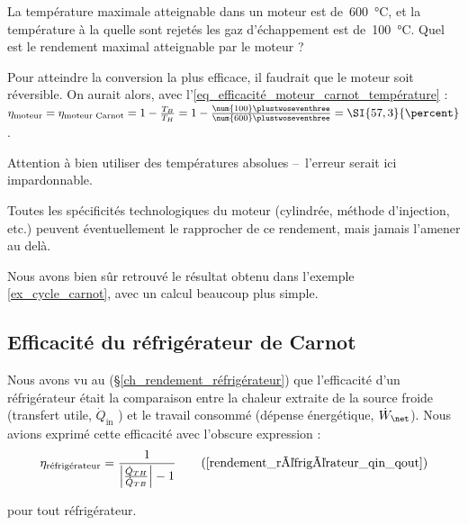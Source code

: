 		\begin{anexample}
		\label{ex_efficacite_moteur_carnot}
			La température maximale atteignable dans un moteur est de~\SI{600}{\degreeCelsius}, et la température à la quelle sont rejetés les gaz d’échappement est de~\SI{100}{\degreeCelsius}. Quel est le rendement maximal atteignable par le moteur ?
				\begin{answer}
					Pour atteindre la conversion la plus efficace, il faudrait que le moteur soit réversible. On aurait alors, avec l’\cref{eq_efficacité_moteur_carnot_température} : $\eta_\text{moteur} = \eta_\text{moteur Carnot} = 1 - \frac{T_B}{T_H} = 1 - \frac{\num{100}\plustwoseventhree}{\num{600}\plustwoseventhree} = \SI{57,3}{\percent}$.
					\begin{remark}Attention à bien utiliser des températures absolues --\ l’erreur serait ici impardonnable.\end{remark}
					\begin{remark}Toutes les spécificités technologiques du moteur (cylindrée, méthode d’injection, etc.) peuvent éventuellement le rapprocher de ce rendement, mais jamais l’amener au delà.\end{remark}
					\begin{remark}Nous avons bien sûr retrouvé le résultat obtenu dans l’exemple \ref{ex_cycle_carnot}, avec un calcul beaucoup plus simple.\end{remark}
				\end{answer}
		\end{anexample}


	\subsection{Efficacité du réfrigérateur de Carnot}

		Nous avons vu au (\S\ref{ch_rendement_réfrigérateur}) que l’efficacité d’un réfrigérateur était la comparaison entre la chaleur extraite de la source froide (transfert utile, $\dot Q_\text{in}$ ) et le travail consommé (dépense énergétique, $\dot W_\net$).  Nous avions exprimé cette efficacité avec l’obscure expression :
		\begin{equation}
			\eta_\text{réfrigérateur} = \frac{1}{ \left| \frac{\dot Q_{TH}}{\dot Q_{TB}} \right| - 1} \tag{\ref{rendement_réfrigérateur_qin_qout}}
		\end{equation}
		\begin{equationterms}
			\item pour tout réfrigérateur.
		\end{equationterms}


